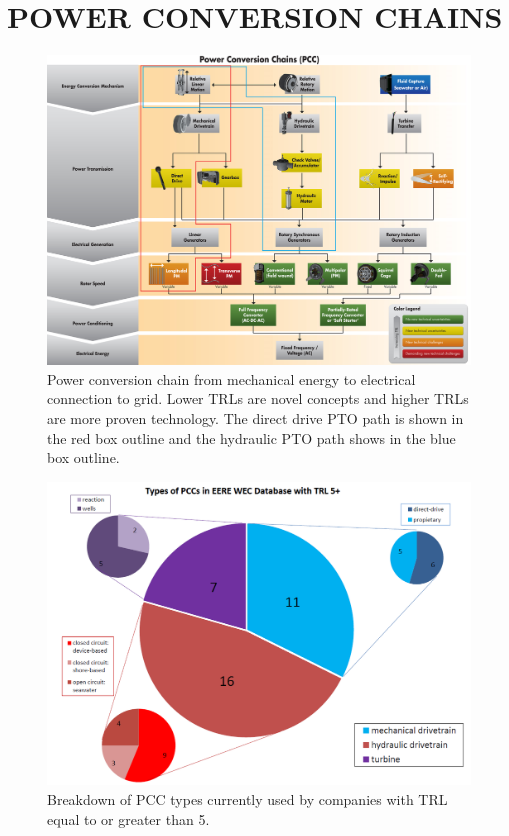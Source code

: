 \documentclass[twocolumn,10pt]{asme2e}
\begin{document}
\section*{POWER CONVERSION CHAINS}

\begin{figure}[t] 
    \centering
    \includegraphics[width=1.95\columnwidth]{Images/PCC_HydDD}
    \caption{Power conversion chain from mechanical energy to electrical connection to grid. Lower TRLs are novel concepts and higher TRLs are more proven technology. The direct drive PTO path is shown in the red box outline and the hydraulic PTO path shows in the blue box outline.}
    \label{PCC}
    \end{figure}

\begin{figure}[t]
    \centering
    \includegraphics[width=1\columnwidth]{Images/TRL}
    \caption{Breakdown of PCC types currently used by companies with TRL equal to or greater than 5.}
    \label{PCC_Breakdown}
    \end{figure}
\end{document}
